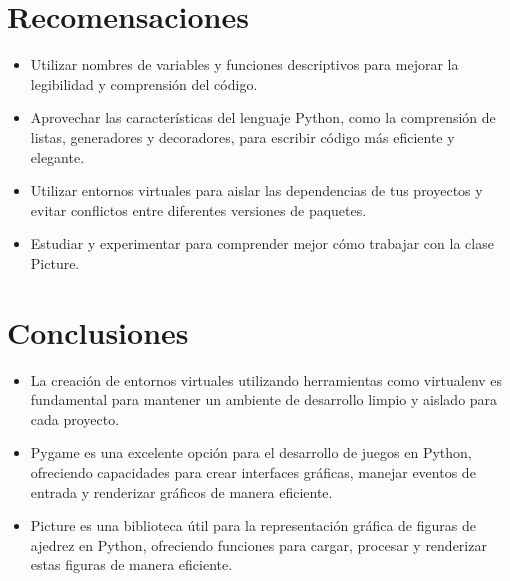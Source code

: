 \documentclass{article}
\begin{document}
  \section{Recomensaciones}
  \begin{itemize}
    \item Utilizar nombres de variables y funciones descriptivos para mejorar la legibilidad y comprensión del código.
    \item Aprovechar las características del lenguaje Python, como la comprensión de listas, generadores y decoradores, 
      para escribir código más eficiente y elegante.
    \item Utilizar entornos virtuales para aislar las dependencias de tus proyectos y evitar conflictos entre diferentes versiones de paquetes.
    \item Estudiar y experimentar para comprender mejor cómo trabajar con la clase Picture.
  \end{itemize}


  \section{Conclusiones}
  \begin{itemize}
    \item La creación de entornos virtuales utilizando herramientas como virtualenv es fundamental para mantener un ambiente 
      de desarrollo limpio y aislado para cada proyecto.
    \item Pygame es una excelente opción para el desarrollo de juegos en Python, ofreciendo capacidades para crear interfaces 
      gráficas, manejar eventos de entrada y renderizar gráficos de manera eficiente.
    \item Picture es una biblioteca útil para la representación gráfica de figuras de ajedrez en Python, ofreciendo 
      funciones para cargar, procesar y renderizar estas figuras de manera eficiente.
  \end{itemize}

	\newpage
\end{document}

